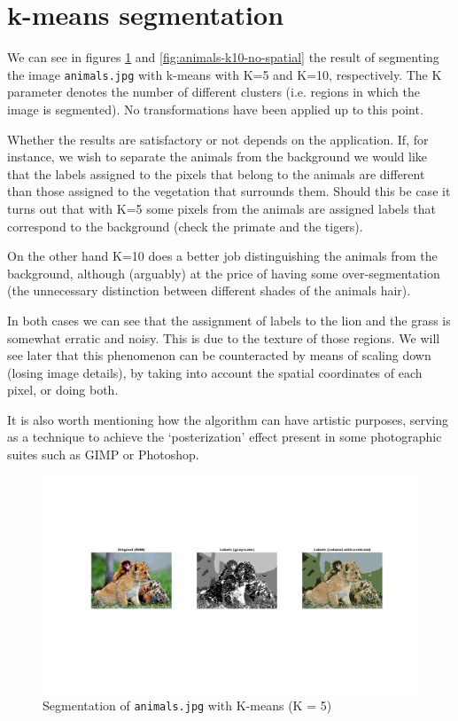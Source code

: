 \section{k-means segmentation}

We can see in figures \ref{fig:animals-k5-no-spatial} and
\ref{fig:animals-k10-no-spatial} the result of segmenting
the image \texttt{animals.jpg} with k-means with K=5 and K=10, respectively.
The K parameter denotes the number of different clusters (i.e. regions in
which the image is segmented). No transformations have been applied up to this point.

Whether the results are satisfactory or not depends on the application.
If, for instance, we wish to separate the animals from the
background we would like that the labels assigned to the
pixels that belong to the animals are different than those
assigned to the vegetation that surrounds them. Should this
be case it turns out that with K=5 some pixels from the
animals are assigned labels that correspond to the background
(check the primate and the tigers).

On the other hand K=10 does a better job distinguishing the
animals from the background, although (arguably) at the price
of having some over-segmentation (the unnecessary distinction
between different shades of the animals hair).

In both cases we can see that the assignment of labels to the lion
and the grass is somewhat erratic and noisy. This is due to the texture
of those regions. We will see later that this phenomenon can be counteracted
by means of scaling down (losing image details), by taking into account the
spatial coordinates of each pixel, or doing both.

It is also worth
mentioning how the algorithm can have artistic purposes, serving as
a technique to achieve the
`posterization' effect present in some photographic suites such as GIMP
or Photoshop.

\begin{figure}[hbt]
\centering
\includegraphics[trim={50px 250px 50px 220px},clip,width=\textwidth]{img/kmeans/animals_k5_no_spatial.png}
\caption{Segmentation of \texttt{animals.jpg} with K-means (K = 5)}
\label{fig:animals-k5-no-spatial}
\end{figure}

